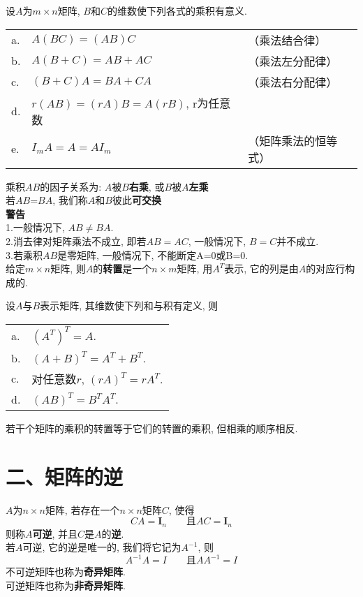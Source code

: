 \begin{theorem}
设$A$为$m\times n$矩阵, $B$和$C$的维数使下列各式的乘积有意义.\\
\begin{tabular}{l@{\ }l l}
a. & $A(BC)=(AB)C$ & （乘法结合律）\\
b. & $A(B+C)=AB+AC$ & （乘法左分配律）\\
c. & $(B+C)A=BA+CA$ & （乘法右分配律）\\
d. & $r(AB)=(rA)B=A(rB)$, r为任意数 &\\
e. & $I_mA=A=AI_m$ & （矩阵乘法的恒等式）
\end{tabular}
\end{theorem}\vspace{4ex}

乘积$AB$的因子关系为: $A$被$B$\textbf{右乘}, 或$B$被$A$\textbf{左乘}\\
若$AB$=$BA$, 我们称$A$和$B$彼此\textbf{可交换}\\[2ex]

\textbf{警告}\\
1.一般情况下, $AB\neq BA$.\\
2.消去律对矩阵乘法不成立, 即若$AB=AC$, 一般情况下, $B=C$并不成立.\\
3.若乘积$AB$是零矩阵, 一般情况下, 不能断定A=0或B=0.\\[2ex]

给定$m\times n$矩阵, 则$A$的\textbf{转置}是一个$n\times m$矩阵, 用$A^T$表示, 它的列是由$A$的对应行构成的.\\[2ex]

\begin{theorem}
设$A$与$B$表示矩阵, 其维数使下列和与积有定义, 则\\
\begin{tabular}{l@{\ }l}
a. & $(A^T)^T=A$.\\
b. & $(A+B)^T=A^T+B^T$.\\
c. & 对任意数$r$, $(rA)^T=rA^T$.\\
d. & $(AB)^T=B^TA^T$.
\end{tabular}
\end{theorem}\vspace{4ex}

\begin{law}
若干个矩阵的乘积的转置等于它们的转置的乘积, 但相乘的顺序相反.
\end{law}\vspace{8ex}

\section{二、矩阵的逆}
$A$为$n\times n$矩阵, 若存在一个$n\times n$矩阵$C$, 使得
\[CA=\bm{I}_n\qquad\text{且}AC=\bm{I}_n\]
则称$A$\textbf{可逆}, 并且$C$是$A$的\textbf{逆}.\\[2ex]
若$A$可逆, 它的逆是唯一的, 我们将它记为$A^{-1}$, 则
\[A^{-1}A=I\qquad\text{且}AA^{-1}=I\]
不可逆矩阵也称为\textbf{奇异矩阵}.\\
可逆矩阵也称为\textbf{非奇异矩阵}.\\[2ex]

